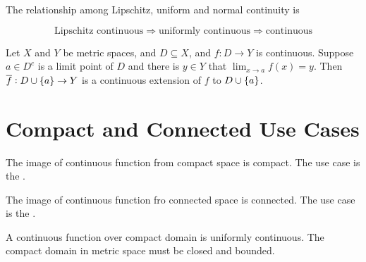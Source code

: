 \begin{theorem}
    The relationship among Lipschitz, uniform and normal continuity is
    
    \begin{equation}
        \text{Lipschitz continuous} \Rightarrow \text{uniformly continuous} \Rightarrow \text{continuous}
    \end{equation}    
\end{theorem}


\begin{theorem}
    Let $X$ and $Y$ be metric spaces, and $D \subseteq X$, and $f: D\rightarrow Y$ is continuous. Suppose $a \in D^c$ is a limit point of $D$ and there is $y \in Y$ that $\lim_{x \rightarrow a} f(x) = y$. Then $\overline{f}: D \cup \set{a} \rightarrow Y$ is a continuous extension of $f$ to $D \cup \set{a}$.
\end{theorem}



\section{Compact and Connected Use Cases}

\begin{theorem}
    The image of continuous function from compact space is compact. The use case is the .
\end{theorem}

\begin{theorem}
    The image of continuous function fro connected space is connected. The use case is the .
\end{theorem}

\begin{theorem}
    A continuous function over compact domain is uniformly continuous. The compact domain in metric space must be closed and bounded.
\end{theorem}

